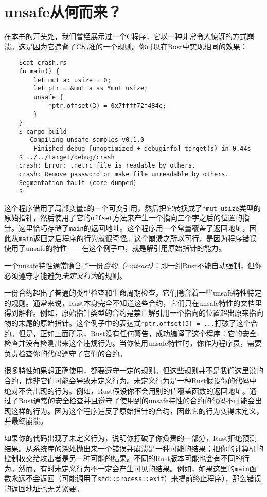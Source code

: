 \section{unsafe从何而来？}
在本书的开头处，我们曾经展示过一个C程序，它以一种非常令人惊讶的方式崩溃。这是因为它违背了C标准的一个规则。你可以在Rust中实现相同的效果：

\begin{verbatim}
    $cat crash.rs
    fn main() {
        let mut a: usize = 0;
        let ptr = &mut a as *mut usize;
        unsafe {
            *ptr.offset(3) = 0x7ffff72f484c;
        }
    }
    $ cargo build
       Compiling unsafe-samples v0.1.0
        Finished debug [unoptimized + debuginfo] target(s) in 0.44s
    $ ../../target/debug/crash
    crash: Error: .netrc file is readable by others.
    crash: Remove password or make file unreadable by others.
    Segmentation fault (core dumped)
    $
\end{verbatim}

这个程序借用了局部变量\texttt{a}的一个可变引用，然后把它转换成了\texttt{*mut usize}类型的原始指针，然后使用了它的\texttt{offset}方法来产生一个指向三个字之后的位置的指针。这里恰巧存储了\texttt{main}的返回地址。这个程序用一个常量覆盖了返回地址，因此从\texttt{main}返回之后程序的行为就很奇怪。这个崩溃之所以可行，是因为程序错误使用了unsafe的特性——在这个例子中，就是解引用原始指针的能力。

一个unsafe特性通常隐含了一份\emph{合约（contract）}：即一组Rust不能自动强制，但你必须遵守才能避免\emph{未定义行为}的规则。

一份合约超出了普通的类型检查和生命周期检查，它们隐含着一些unsafe特性特定的规则。通常来说，Rust本身完全不知道这些合约，它们只在unsafe特性的文档里得到解释。例如，原始指针类型的合约是禁止解引用一个指向的位置超出原来指向物的末尾的原始指针。这个例子中的表达式\texttt{*ptr.offset(3) = ...}打破了这个合约。但是，正如上面所示，Rust没有任何警告，成功编译了这个程序：它的安全检查并没有检测出来这个违规行为。当你使用unsafe特性时，你作为程序员，需要负责检查你的代码遵守了它们的合约。

很多特性如果想正确使用，都要遵守一定的规则。但这些规则并不是我们这里说的合约，除非它们可能会导致未定义行为。未定义行为是一种Rust假设你的代码中绝对不会出现的行为。例如，Rust假设你不会用别的值覆盖函数的返回地址。通过了Rust通常的安全检查并且遵守了使用到的unsafe特性的合约的代码不可能会出现这样的行为。因为这个程序违反了原始指针的合约，因此它的行为变得未定义，并最终崩溃。

如果你的代码出现了未定义行为，说明你打破了你负责的一部分，Rust拒绝预测结果。从系统库的深处抛出来一个错误并崩溃是一种可能的结果；把你的计算机的控制权交给攻击者是另一种可能的结果。不同的Rust版本可能也会有不同的行为。然而，有时未定义行为不一定会产生可见的结果。例如，如果这里的\texttt{main}函数永远不会返回（可能调用了\texttt{std::process::exit}）来提前终止程序），那么错误的返回地址也无关紧要。

